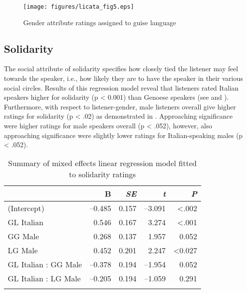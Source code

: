 \documentclass[output=paper,colorlinks,citecolor=brown]{langscibook}
\begin{document}

\begin{figure}
    \texttt{[image: figures/licata\_fig5.eps]}
    \caption{Gender attribute ratings assigned to guise language}
    \label{fig:licata:05}
\end{figure}



\subsection{Solidarity}
The social attribute of solidarity specifies how closely tied the listener may feel towards the speaker, i.e., how likely they are to have the speaker in their various social circles. Results of this regression model reveal that listeners rated Italian speakers higher for solidarity (p < 0.001) than Genoese speakers (see  and ). Furthermore, with respect to listener-gender, male listeners overall give higher ratings for solidarity (p < .02) as demonstrated in . Approaching significance were higher ratings for male speakers overall (p < .052), however, also approaching significance were slightly lower ratings for Italian-speaking males (p < .052).

\begin{table}
\begin{tabular}{lrrrr}\lsptoprule
                     & Β      & \textit{SE} & \textit{t} & \textit{P} \\ \midrule
(Intercept)          & –0.485 & 0.157       & –3.091     & <.002      \\
GL Italian           & 0.546  & 0.167       & 3.274      & <.001      \\
GG Male              & 0.268  & 0.137       & 1.957      & 0.052      \\
LG Male              & 0.452  & 0.201       & 2.247      & <0.027     \\
GL Italian : GG Male & –0.378 & 0.194       & –1.954     & 0.052      \\
GL Italian : LG Male & –0.205 & 0.194       & –1.059     & 0.291      \\
\lspbottomrule
\end{tabular}
\caption{Summary of mixed effects linear regression model fitted to solidarity ratings}
\label{tab:licata:03}
\end{table}
\end{document}
